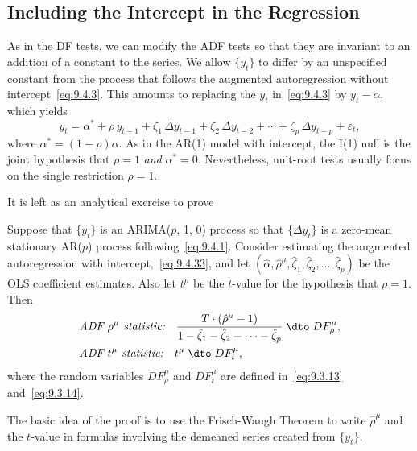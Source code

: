 \subsection*{Including the Intercept in the Regression}

As in the DF tests, we can modify the ADF tests so that they are invariant to an
addition of a constant to the series. We allow $\{y_t\}$ to differ by an unspecified
constant from the process that follows the augmented autoregression without intercept~\eqref{eq:9.4.3}. This amounts to replacing the $y_t$ in~\eqref{eq:9.4.3} by $y_t - \alpha$, which yields
\begin{equation}
\label{eq:9.4.33}
y_t = \alpha^* + \rho\, y_{t-1} + \zeta_1\,\Delta y_{t-1} + \zeta_2\,\Delta y_{t-2}
+ \cdots + \zeta_p\,\Delta y_{t-p} + \varepsilon_t,
\end{equation}
where $\alpha^* = (1 - \rho)\alpha$. As in the AR(1) model with intercept, the I(1) null is the
joint hypothesis that $\rho = 1$ \emph{and} $\alpha^* = 0$. Nevertheless, unit-root tests usually focus
on the single restriction $\rho = 1$.

It is left as an analytical exercise to prove

\begin{proposition}
\label{prop:9.7}
Suppose that $\{y_t\}$ is an ARIMA($p$, 1, 0) process so that $\{\Delta y_t\}$ is a zero-mean
stationary AR($p$) process following~\eqref{eq:9.4.1}. Consider estimating the augmented
autoregression with intercept,~\eqref{eq:9.4.33}, and let $(\hat{\alpha}, \hat{\rho}^\mu, \hat{\zeta}_1, \hat{\zeta}_2, \ldots, \hat{\zeta}_p)$ be the OLS
coefficient estimates. Also let $t^\mu$ be the $t$-value for the hypothesis that $\rho = 1$. Then
\begin{align}
&\textit{ADF $\rho^\mu$ statistic:}\quad
\frac{T \cdot (\hat{\rho}^\mu - 1)}{1 - \hat{\zeta}_1 - \hat{\zeta}_2 - \cdots - \hat{\zeta}_p}
\;\dto\; DF_\rho^\mu,
\label{eq:9.4.34} \\
&\textit{ADF $t^\mu$ statistic:}\quad t^\mu \;\dto\; DF_t^\mu,
\label{eq:9.4.35}
\end{align}
where the random variables $DF_\rho^\mu$ and $DF_t^\mu$ are defined in~\eqref{eq:9.3.13} and~\eqref{eq:9.3.14}.
\end{proposition}

The basic idea of the proof is to use the Frisch-Waugh Theorem to write $\hat{\rho}^\mu$ and
the $t$-value in formulas involving the demeaned series created from $\{y_t\}$.

